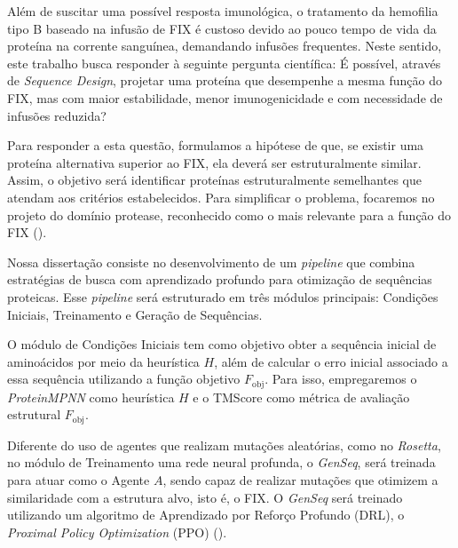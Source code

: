\label{section:Proposta}

Além de suscitar uma possível resposta imunológica, 
o tratamento da hemofilia tipo B baseado na infusão de  FIX
é custoso devido ao pouco tempo de vida da proteína na corrente sanguínea, demandando infusões frequentes. 
Neste sentido, este trabalho busca responder à seguinte pergunta científica: 
É possível, através de \textit{Sequence Design}, projetar uma proteína que desempenhe a mesma função do FIX, 
mas com maior estabilidade, menor imunogenicidade e com necessidade de infusões reduzida? %

Para responder a esta questão, formulamos a hipótese de que, 
se existir uma proteína alternativa superior ao FIX, 
ela deverá ser estruturalmente similar. 
Assim, o objetivo será identificar proteínas estruturalmente semelhantes que atendam aos critérios estabelecidos.
Para simplificar o problema, focaremos no projeto do domínio protease, 
reconhecido como o mais relevante para a função do FIX (\cite{FIX}).

Nossa dissertação consiste no desenvolvimento de um \textit{pipeline} que combina estratégias de busca 
com aprendizado profundo para otimização de sequências proteicas. 
Esse \textit{pipeline} será estruturado em três módulos principais: Condições Iniciais, 
Treinamento e Geração de Sequências.


O módulo de Condições Iniciais tem como objetivo obter a sequência inicial de aminoácidos 
por meio da heurística \( H \), além de calcular o erro inicial associado a essa sequência 
utilizando a função objetivo \( F_{\text{obj}} \). 
Para isso, empregaremos o \textit{ProteinMPNN} como heurística \( H \) 
e o TMScore como métrica de avaliação estrutural \( F_{\text{obj}} \).  

Diferente do uso de agentes que realizam mutações aleatórias, como no \textit{Rosetta},
no módulo de Treinamento uma rede neural profunda, o \textit{GenSeq}, será treinada para atuar como o Agente $A$,
sendo capaz de realizar mutações que otimizem a similaridade com a estrutura alvo, isto é, o FIX.
O \textit{GenSeq} será treinado utilizando um algoritmo de Aprendizado por Reforço Profundo (DRL), 
o \textit{Proximal Policy Optimization} (PPO) (\cite{PPO}).

